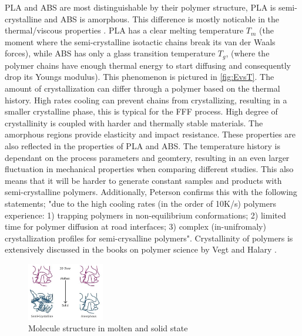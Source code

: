 PLA and ABS are most distinguishable by their polymer structure,  PLA is semi-crystalline and ABS is amorphous. This difference is mostly noticable in the thermal/viscous properties \cite{Rodriguez-Panes2018TheAnalysis}. PLA has a clear melting temperature $T_m$ (the moment where the semi-crystalline isotactic chains break its van der Waals forces), while ABS has only a glass transition temperature $T_g$, (where the polymer chains have enough thermal energy to start diffusing and consequently drop its Youngs modulus). This phenomenon is pictured in \ref{fig:EvsT}. The amount of crystallization can differ through a polymer based on the thermal history. High rates cooling can prevent chains from crystallizing, resulting in a smaller crystalline phase, this is typical for the FFF process. High degree of crystallinity is coupled with harder and thermally stable materials\cite{Balani2015PhysicalPolymers}. The amorphous regions provide elasticity and impact resistance. These properties are also reflected in the properties of PLA and ABS. The temperature history is dependant on the process parameters and geomtery, resulting in an even larger fluctuation in mechanical properties when comparing different studies. This also means that it will be harder to generate constant samples and products with semi-crystalline polymers. Additionally, Peterson \cite{Peterson2019ReviewPerspective} confirms this with the following statements; "due to the high cooling rates (in the order of 10K/s) polymers experience: 1) trapping polymers in non-equilibrium conformations; 2) limited time for polymer diffusion at road interfaces; 3) complex (in-unifromaly) crystallization profiles for semi-crysalline polymers". Crystallinity of polymers is extensively discussed in the books on polymer science by Vegt \cite{Vegt2001FromPlastics} and Halary \cite{Halary2011PolymerMaterials}.

\begin{figure}[H]
    \centering
    \includegraphics[width=0.3\textwidth]{chapter_2/figures/structurepolymers.PNG}
    \caption{Molecule structure in molten and solid state \cite{PtolinePolymersCrystalline}}
    \label{fig:structurepolymers}
\end{figure}

